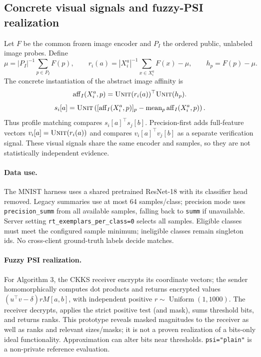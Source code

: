 \documentclass[11pt]{article}
\newcommand{\aff}{\mathrm{aff}}
\newcommand{\unit}{\textsc{Unit}}
\begin{document}
\subsection*{Concrete visual signals and fuzzy-PSI realization}
\label{alg:affimpl}
Let $F$ be the common frozen image encoder and $P_I$ the ordered public,
unlabeled image probes. Define
\[
 \mu=|P_I|^{-1}\sum_{p\in P_I}F(p),\qquad
 r_i(a)=|X_i^a|^{-1}\sum_{x\in X_i^a}F(x)-\mu,\qquad h_p=F(p)-\mu.
\]
The concrete instantiation of the abstract image affinity is
\[
 \aff_I(X_i^a,p)=\unit(r_i(a))^\top\unit(h_p).
\]
\[
 s_i[a]=\unit\left([\aff_I(X_i^a,p)]_p-\operatorname{mean}_p\aff_I(X_i^a,p)\right).
\]
Thus profile matching compares $s_i[a]^\top s_j[b]$.
Precision-first adds full-feature vectors $v_i[a]=\unit(r_i(a))$ and
compares $v_i[a]^\top v_j[b]$ as a separate verification signal.
These visual signals share the same encoder and samples, so they are not
statistically independent evidence.

\paragraph{Data use.}
The MNIST harness uses a shared pretrained ResNet-18 with its classifier head
removed. Legacy summaries use at most 64 samples/class; precision mode uses
\texttt{precision\_summ} from all available samples, falling back to
\texttt{summ} if unavailable. Server setting
\texttt{rt\_exemplars\_per\_class=0} selects all samples.
Eligible classes must meet the configured sample minimum; ineligible classes
remain singleton ids. No cross-client ground-truth labels decide matches.

\paragraph{Fuzzy PSI realization.}\label{alg:fpsimpl}
For Algorithm 3, the CKKS receiver encrypts its coordinate vectors; the sender
homomorphically computes dot products and returns encrypted values
$(u^\top v-\delta)rM[a,b]$, with independent positive
$r\sim\operatorname{Uniform}(1,1000)$. The receiver decrypts, applies the strict
positive test (and mask), sums threshold bits, and returns ranks.
This prototype reveals masked magnitudes to the receiver as well as ranks
and relevant sizes/masks; it is not a proven realization of a bits-only ideal
functionality. Approximation can alter bits near thresholds.
\texttt{psi="plain"} is a non-private reference evaluation.
\end{document}
